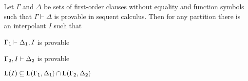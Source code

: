 

\begin{lemma}[Maehara]
	\label{lemma:maehara}
	Let $\Gamma$ and $\Delta$ be sets of first-order clauses without equality and function symbols such that $\Gamma \vdash \Delta$ is provable in sequent calculus.
	Then for any partition 
	there is an interpolant $I$ such that
	\begin{compactenum}
	\item $\Gamma_1 \vdash \Delta_1, I$ is provable 
		\label{maehcond1}
	\item $\Gamma_2, I \vdash \Delta_2$ is provable 
		\label{maehcond2}
	\item $\operatorname{L}(I) \subseteq \operatorname{L}(\Gamma_1, \Delta_1) \cap \operatorname{L}(\Gamma_2, \Delta_2)$
		\label{maehcond3}
	\end{compactenum}
\end{lemma}
